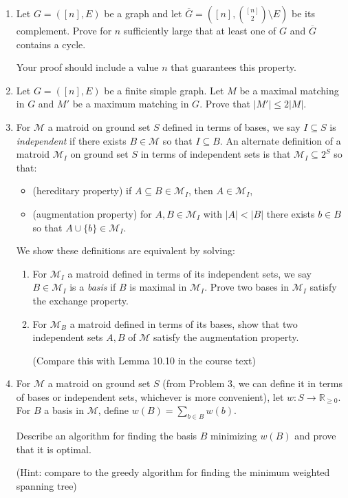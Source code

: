 \documentclass[11pt,letterpaper]{article}
\begin{document}
\begin{enumerate}

\item Let $G = ([n],E)$ be a graph and let $\overline{G} = ([n], \binom{[n]}{2} \setminus E)$ be its complement.
Prove for $n$ sufficiently large that at least one of $G$ and $\overline{G}$ contains a cycle.

Your proof should include a value $n$ that guarantees this property.

\item Let $G = ([n],E)$ be a finite simple graph.
Let $M$ be a maximal matching in $G$ and $M'$ be a maximum matching in $G$.
Prove that $|M'| \leq 2 |M|$.


\item For $\mathcal{M}$ a matroid on ground set $S$ defined in terms of bases, we say $I \subseteq S$ is \emph{independent} if there exists $B \in \mathcal{M}$ so that $I \subseteq B$.
An alternate definition of a matroid $\mathcal{M}_I$ on ground set $S$ in terms of independent sets is that $\mathcal{M}_I \subseteq 2^{S}$ so that:
\begin{itemize}
	\item (hereditary property) if $A \subseteq B \in \mathcal{M}_I$, then $A \in \mathcal{M}_I$,
	\item (augmentation property) for $A, B \in \mathcal{M}_I$ with $|A| < |B|$ there exists $b \in B$ so that $A \cup \{b\} \in \mathcal{M}_I$.
\end{itemize}
We show these definitions are equivalent by solving:
\begin{enumerate}	
	\item For $\mathcal{M}_I$ a matroid defined in terms of its independent sets, we say $B \in \mathcal{M}_I$ is a \emph{basis} if $B$ is maximal in $\mathcal{M}_I$.
	Prove two bases in $\mathcal{M}_I$ satisfy the exchange property.
	
	\item For $\mathcal{M}_B$ a matroid defined in terms of its bases, show that two independent sets $A,B$ of $\mathcal{M}$ satisfy the augmentation property.
	
	(Compare this with Lemma 10.10 in the course text)
\end{enumerate}
 
\item For $\mathcal{M}$ a matroid on ground set $S$ (from Problem 3, we can define it in terms of bases or independent sets, whichever is more convenient), let $w:S \to \mathbb{R}_{\geq 0}$.
For $B$ a basis in $\mathcal{M}$, define $w(B) = \sum_{b \in B} w(b)$.

Describe an algorithm for finding the basis $B$ minimizing $w(B)$ and prove that it is optimal.

(Hint: compare to the greedy algorithm for finding the minimum weighted spanning tree)




\end{enumerate}
\end{document}
